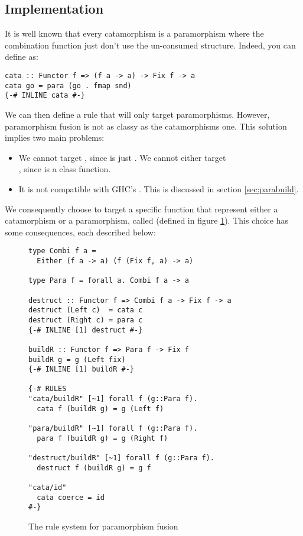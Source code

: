 \subsection{Implementation}
\label{sec:para-impl}

It is well known that every catamorphism is a paramorphism where the combination function just don't use the un-consumed structure. Indeed, you can define  as:
\begin{verbatim}
cata :: Functor f => (f a -> a) -> Fix f -> a
cata go = para (go . fmap snd)
{-# INLINE cata #-}
\end{verbatim}

\noindent We can then define a rule that will only target paramorphisms. However, paramorphism fusion is not as classy as the catamorphisms one. This solution implies two main problems:
\begin{itemize}
\item We cannot target , since  is just . We cannot either target\\ , since  is a class function.

\item It is not compatible with GHC's . This is discussed in section \ref{sec:parabuild}.
\end{itemize}

We consequently choose to target a specific function that represent either a catamorphism or a paramorphism, called  (defined in figure \ref{fig:para}). This choice has some consequences, each described below:

\begin{figure}
\begin{verbatim}
type Combi f a =
  Either (f a -> a) (f (Fix f, a) -> a)
  
type Para f = forall a. Combi f a -> a 

destruct :: Functor f => Combi f a -> Fix f -> a
destruct (Left c)  = cata c
destruct (Right c) = para c
{-# INLINE [1] destruct #-}

buildR :: Functor f => Para f -> Fix f
buildR g = g (Left fix)
{-# INLINE [1] buildR #-}

{-# RULES
"cata/buildR" [~1] forall f (g::Para f).
  cata f (buildR g) = g (Left f)

"para/buildR" [~1] forall f (g::Para f).
  para f (buildR g) = g (Right f)

"destruct/buildR" [~1] forall f (g::Para f).
  destruct f (buildR g) = g f

"cata/id"
  cata coerce = id
#-}

\end{verbatim}
\caption{The rule system for paramorphism fusion}
\label{fig:para}
\end{figure}

